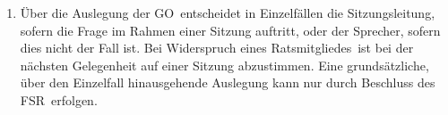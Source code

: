 \documentclass[a4paper, 12pt, ngerman]{article}
\newcommand{\rates}{FSR}
\newcommand{\go}{GO}
\newcommand{\mitgliedes}{Ratsmitgliedes}
\begin{document}
\begin{enumerate}[leftmargin=0cm]
	\item {}
	
	 Über die Auslegung der \go~entscheidet in Einzelfällen die Sitzungsleitung, sofern die Frage im Rahmen einer Sitzung auftritt, oder der Sprecher, sofern dies nicht der Fall ist. Bei Widerspruch eines \mitgliedes~ist bei der nächsten Gelegenheit auf einer Sitzung abzustimmen. Eine grundsätzliche, 
	 über den Einzelfall hinausgehende Auslegung kann nur durch Beschluss des \rates~erfolgen.			
	\end{enumerate}
\end{document}
